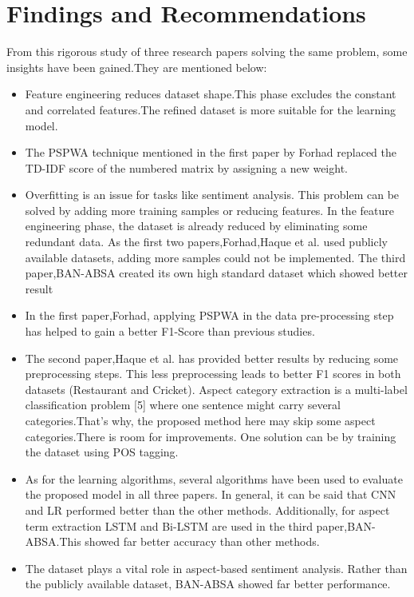 \documentclass[a4paper,12pt]{article}
\begin{document}
\section{Findings and Recommendations}
From this rigorous study of three research papers solving the same problem, some insights have been gained.They are mentioned below:\newline
\begin{itemize}
        \item Feature engineering reduces dataset shape.This phase excludes the constant and correlated features.The refined dataset is more suitable for the learning model.
        \item The PSPWA technique mentioned in the first paper by Forhad\cite{first} replaced the TD-IDF score of the numbered matrix by assigning a new weight.
        \item Overfitting is an issue for tasks like sentiment analysis. This problem can be solved by adding more training samples or reducing features.\newline
        In the feature engineering phase, the dataset is already reduced by eliminating some redundant data. As the first two papers,Forhad\cite{first},Haque et al.\cite{second} used publicly available datasets, adding more samples could not be implemented.\newline
        The third paper,BAN-ABSA\cite{third} created its own high standard dataset which showed better result
        \item In the first paper,Forhad\cite{first}, applying PSPWA in the data pre-processing step has helped to gain a better F1-Score than previous studies.

        \item The second paper,Haque et al.\cite{second} has provided better results by reducing some preprocessing steps. This less preprocessing leads to better F1 scores in both datasets (Restaurant and Cricket).\newline
        Aspect category extraction is a multi-label classification problem [5] where one sentence might carry several categories.That's why, the proposed method here may skip some aspect categories.There is room for improvements.\newline
        One solution can be by training the dataset using POS tagging.
        \item As for the learning algorithms, several algorithms have been used to evaluate the proposed model in all three papers. In general, it can be said that CNN and LR performed better than the other methods.\newline
        Additionally, for aspect term extraction LSTM and Bi-LSTM are used in the third paper,BAN-ABSA\cite{third}.This showed far better accuracy than other methods.
        \item The dataset plays a vital role in aspect-based sentiment analysis. Rather than the publicly available dataset, BAN-ABSA\cite{third} showed far better performance. 
\end{itemize}
\end{document}
